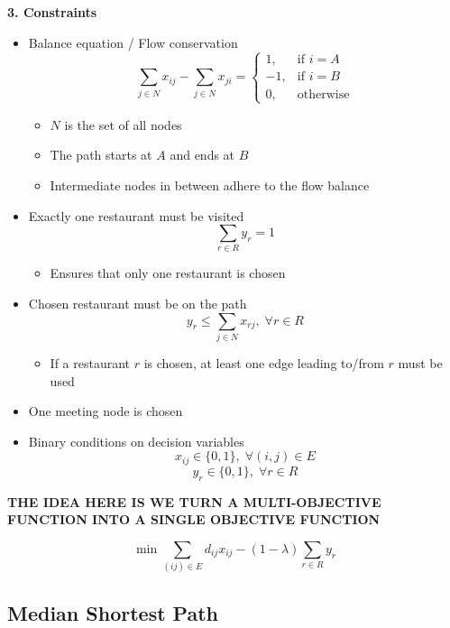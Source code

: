\documentclass[12pt]{report}
\begin{document}
\textbf{3. Constraints}
\begin{itemize}
    \item Balance equation / Flow conservation
    $$\sum_{j \in N} x_{ij} - \sum_{j \in N} x_{ji} = \begin{cases}
        1, & \text{if } i=A\\
        -1, & \text{if } i=B\\
        0, & \text{otherwise}
    \end{cases}$$
    \begin{itemize}
        \item $N$ is the set of all nodes
        \item The path starts at $A$ and ends at $B$
        \item Intermediate nodes in between adhere to the flow balance
    \end{itemize}

    \item Exactly one restaurant must be visited
    $$\sum_{r\in R} y_r =1$$
    \begin{itemize}
        \item Ensures that only one restaurant is chosen
    \end{itemize}

    \item Chosen restaurant must be on the path
    $$y_r \leq \sum_{j \in N} x_{rj}, \; \forall r\in R $$
    \begin{itemize}
        \item If a restaurant $r$ is chosen, at least one edge leading to/from $r$ must be used
    \end{itemize}

    \item One meeting node is chosen
    
    

    \item Binary conditions on decision variables
    $$x_{ij} \in \{0,1\}, \; \forall (i,j) \in E$$
    $$y_r \in \{0,1\}, \; \forall r \in R$$
\end{itemize}


\textbf{THE IDEA HERE IS WE TURN A MULTI-OBJECTIVE FUNCTION INTO A SINGLE OBJECTIVE FUNCTION}

$$\min \sum_{(ij)\in E}d_{ij}x_{ij} - (1-\lambda)\sum_{r \in R} y_r$$


\subsection{Median Shortest Path}
\end{document}
